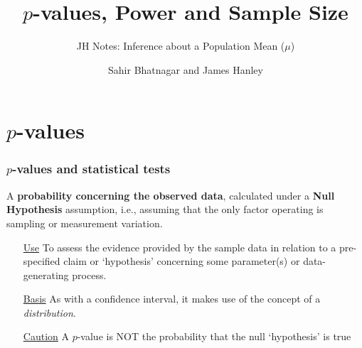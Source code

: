 \documentclass{beamer}\usepackage[]{graphicx}\usepackage[]{color}
\begin{document}




\title{$p$-values, Power and Sample Size}
\subtitle{JH Notes: Inference about a Population Mean ($\mu$)}
\author{Sahir Bhatnagar and James Hanley}


\maketitle

\section{$p$-values}
\begin{frame}
\frametitle{$p$-values and statistical tests}


\begin{defm}[$p$-value]
	A \textbf{probability concerning the observed data}, calculated under a \textbf{Null Hypothesis} assumption, i.e., assuming that the only factor operating is sampling or measurement variation. 
\end{defm}

\begin{itemize} 
	\item[\underline{Use}] To assess the evidence provided by the sample data
	in relation to a pre-specified claim or `hypothesis' concerning some parameter(s) or data-generating process. 
	\item[\underline{Basis}] As with a confidence interval, it makes use of the concept of a \textit{distribution}. 
	\item[\underline{Caution}] A $p$-value is NOT the probability that the null `hypothesis' is true
\end{itemize}
\end{frame}
\end{document}
